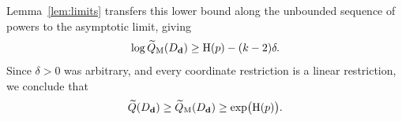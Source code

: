 Lemma~\ref{lem:limits} transfers this lower bound along the
unbounded sequence of powers to the asymptotic limit, giving
\[
 \log\widetilde Q_{\mathrm M}(D_{\mathbf d})\geq\operatorname{H}(p)-(k-2)\delta.
\]
Since $\delta>0$ was arbitrary, and every coordinate restriction
is a linear restriction, we conclude that
\begin{equation}
 \widetilde Q(D_{\mathbf d})\geq\widetilde Q_{\mathrm M}(D_{\mathbf d})
                    \geq\exp\bigl(\operatorname{H}(p)\bigr).
 \label{eq:monomial-lower}
\end{equation}
